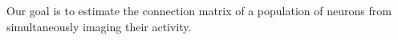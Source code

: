 Our goal is to estimate the connection matrix of a population of neurons from simultaneously imaging their activity. 

